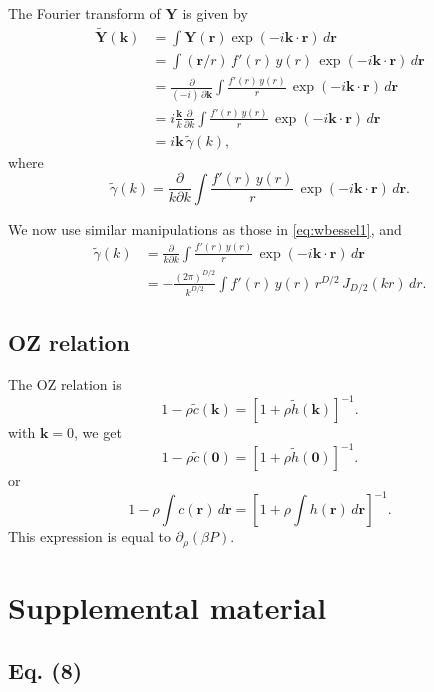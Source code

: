 \documentclass[aip,jcp,reprint,superscriptaddress]{revtex4-1}
\numberwithin{equation}{subsection}
\newcommand{\vct}[1]{\mathbf{#1}}
\providecommand{\vr}{} %
\renewcommand{\vr}{\vct{r}}
\newcommand{\vk}{\vct{k}}
\begin{document}
The Fourier transform of $\vct{Y}$ is given by
\begin{align*}
  \tilde{\vct{Y}}(\vk)
&=
\int \vct{Y}(\vr) \exp(-i\vk\cdot\vr) \, d\vr
\\
&=
\int (\vr/r) \, f'(r) \, y(r) \, \exp(-i\vk\cdot\vr) \, d\vr
\\
&=
\frac{\partial}{(-i) \, \partial \vk}
\int \frac{f'(r) \, y(r)}{r} \, \exp(-i\vk\cdot\vr) \, d\vr
\\
&=
i \frac{\vk}{k} \frac{\partial}{\partial k}
\int \frac{f'(r) \, y(r)}{r} \, \exp(-i\vk\cdot\vr) \, d\vr
\\
&=
i \vk \, \tilde{\gamma}(k),
\end{align*}
%
where
\[
\tilde{\gamma}(k)
=
\frac{\partial}{k\partial k}
\int \frac{f'(r) \, y(r)}{r} \, \exp(-i\vk\cdot\vr) \, d\vr.
\]

We now use similar manipulations as
those in \eqref{eq:wbessel1}, and
\begin{align*}
\tilde{\gamma}(k)
&=
\frac{\partial}{k\partial k}
\int \frac{f'(r) \, y(r)}{r} \, \exp(-i\vk\cdot\vr) \, d\vr
\\
&=-\frac{(2\pi)^{D/2}}{k^{D/2}}
\int f'(r) \, y(r) \, r^{D/2} \, J_{D/2}(kr) \, dr.
\end{align*}



\subsection{OZ relation}

The OZ relation is
\[
  1 - \rho \tilde c(\vk)
=
 [1 + \rho \tilde h(\vk)]^{-1}.
\]
with $\vk = 0$, we get
\[
  1 - \rho \tilde c(\vct 0)
=
 [1 + \rho \tilde h(\vct 0)]^{-1}.
\]
or
\[
  1 - \rho \int c(\vr) \, d\vr
=
 \left[1 + \rho \int h(\vr) \, d\vr \right]^{-1}.
\]
This expression is equal to $\partial_\rho (\beta P)$.



\section{Supplemental material}

\subsection{Eq. (8)}
\end{document}
